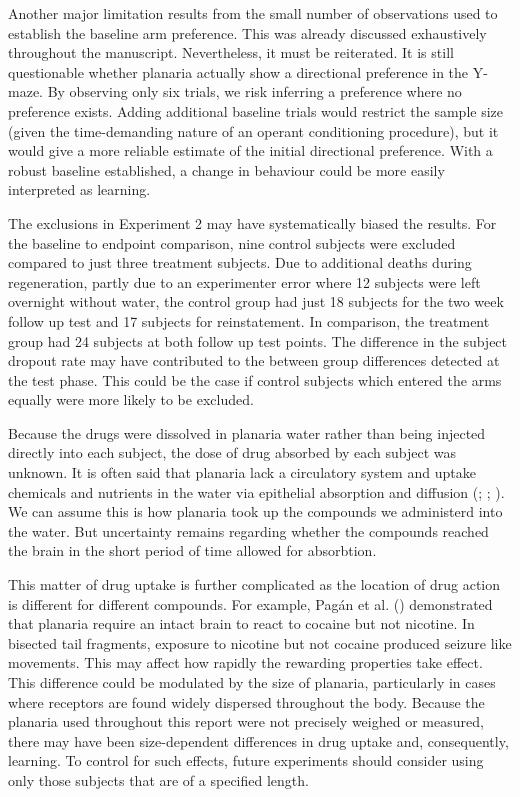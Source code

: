 \documentclass[
  jou,
  floatsintext,
  longtable,
  nolmodern,
  notxfonts,
  notimes,
  donotrepeattitle,
  colorlinks=true,linkcolor=blue,citecolor=blue,urlcolor=blue]{apa7}
\begin{document}
Another major limitation results from the small number of observations
used to establish the baseline arm preference. This was already
discussed exhaustively throughout the manuscript. Nevertheless, it must
be reiterated. It is still questionable whether planaria actually show a
directional preference in the Y-maze. By observing only six trials, we
risk inferring a preference where no preference exists. Adding
additional baseline trials would restrict the sample size (given the
time-demanding nature of an operant conditioning procedure), but it
would give a more reliable estimate of the initial directional
preference. With a robust baseline established, a change in behaviour
could be more easily interpreted as learning.

The exclusions in Experiment 2 may have systematically biased the
results. For the baseline to endpoint comparison, nine control subjects
were excluded compared to just three treatment subjects. Due to
additional deaths during regeneration, partly due to an experimenter
error where 12 subjects were left overnight without water, the control
group had just 18 subjects for the two week follow up test and 17
subjects for reinstatement. In comparison, the treatment group had 24
subjects at both follow up test points. The difference in the subject
dropout rate may have contributed to the between group differences
detected at the test phase. This could be the case if control subjects
which entered the arms equally were more likely to be excluded.

Because the drugs were dissolved in planaria water rather than being
injected directly into each subject, the dose of drug absorbed by each
subject was unknown. It is often said that planaria lack a circulatory
system and uptake chemicals and nutrients in the water via epithelial
absorption and diffusion (; ; ). We can assume this
is how planaria took up the compounds we administerd into the water. But
uncertainty remains regarding whether the compounds reached the brain in
the short period of time allowed for absorbtion.

This matter of drug uptake is further complicated as the location of
drug action is different for different compounds. For example, Pagán et
al. () demonstrated that
planaria require an intact brain to react to cocaine but not nicotine.
In bisected tail fragments, exposure to nicotine but not cocaine
produced seizure like movements. This may affect how rapidly the
rewarding properties take effect. This difference could be modulated by
the size of planaria, particularly in cases where receptors are found
widely dispersed throughout the body. Because the planaria used
throughout this report were not precisely weighed or measured, there may
have been size-dependent differences in drug uptake and, consequently,
learning. To control for such effects, future experiments should
consider using only those subjects that are of a specified length.
\end{document}
